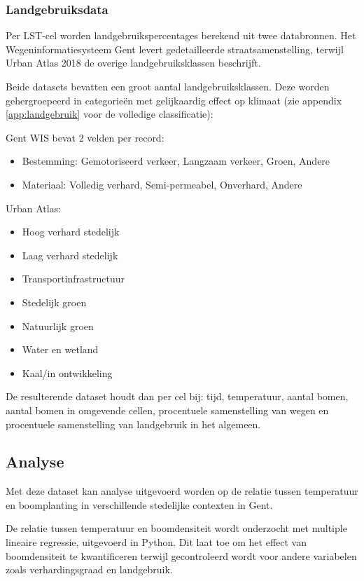 \subsubsection{Landgebruiksdata}

Per LST-cel worden landgebruikspercentages berekend uit twee databronnen. 
Het Wegeninformatiesysteem Gent levert gedetailleerde straatsamenstelling,
terwijl Urban Atlas 2018 de overige landgebruiksklassen beschrijft.

Beide datasets bevatten een groot aantal landgebruiksklassen. Deze worden 
gehergroepeerd in categorieën met gelijkaardig effect op klimaat 
(zie appendix \ref{app:landgebruik} voor de volledige classificatie):

Gent WIS bevat 2 velden per record:
\begin{itemize}
    \item Bestemming: Gemotoriseerd verkeer, Langzaam verkeer, Groen, Andere
    \item Materiaal: Volledig verhard, Semi-permeabel, Onverhard, Andere
\end{itemize}

Urban Atlas:
\begin{itemize}
    \item Hoog verhard stedelijk
    \item Laag verhard stedelijk 
    \item Transportinfrastructuur
    \item Stedelijk groen
    \item Natuurlijk groen
    \item Water en wetland
    \item Kaal/in ontwikkeling
\end{itemize}

De resulterende dataset houdt dan per cel bij: tijd, temperatuur, aantal bomen, aantal bomen in omgevende cellen, 
procentuele samenstelling van wegen en procentuele samenstelling van landgebruik in het algemeen.

\subsection{Analyse}

Met deze dataset kan analyse uitgevoerd worden op de relatie tussen temperatuur en boomplanting in verschillende stedelijke contexten in Gent.

De relatie tussen temperatuur en boomdensiteit wordt onderzocht met multiple lineaire regressie,
uitgevoerd in Python. Dit laat toe om het effect van boomdensiteit te kwantificeren terwijl gecontroleerd wordt 
voor andere variabelen zoals verhardingsgraad en landgebruik.


